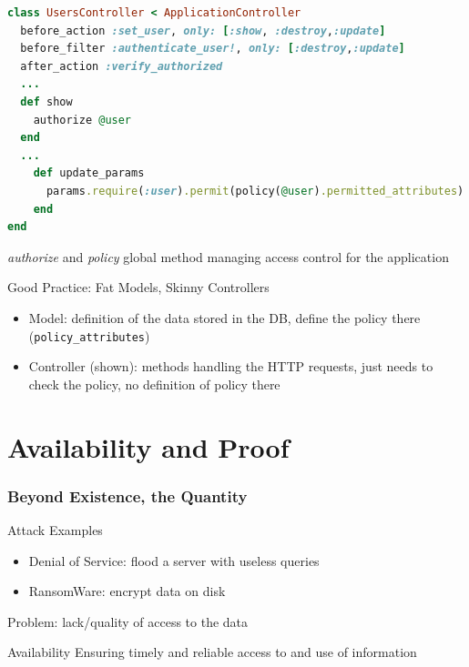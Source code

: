 \begin{reveals}
\begin{frame}[fragile]
\begin{lstlisting}[language=Ruby]
class UsersController < ApplicationController
  before_action :set_user, only: [:show, :destroy,:update]
  before_filter :authenticate_user!, only: [:destroy,:update]
  after_action :verify_authorized
  ...
  def show
    authorize @user
  end
  ...
    def update_params
      params.require(:user).permit(policy(@user).permitted_attributes)
    end
end
\end{lstlisting}
\emph{authorize} and \emph{policy} global method managing access
control for the application 

\begin{block}{Good Practice: Fat Models, Skinny Controllers}
    \begin{itemize}
    \item Model: definition of the data stored in the DB, define the
      policy there (\lstinline[language=Ruby]|policy_attributes|)
    \item Controller (shown): methods handling the HTTP requests, just
      needs to check the policy, no definition of policy there
    \end{itemize}
  \end{block}
\end{frame}



\section{Availability and Proof}

\begin{frame}
  \frametitle{Beyond Existence, the Quantity}

  \vfill

  \begin{block}{Attack Examples}
    \begin{itemize}
    \item Denial of Service: flood a server with useless queries
    \item RansomWare: encrypt data on disk
    \end{itemize}
    Problem: lack/quality of access to the data 
  \end{block}

  \vfill

  \begin{block}{Availability}
    Ensuring timely and reliable access to and use of information
  \end{block}


\end{frame}
\end{reveals}
